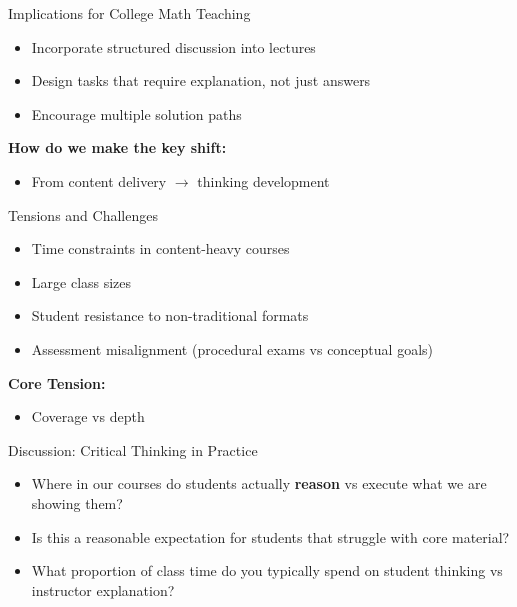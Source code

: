 \documentclass[dvipsnames]{beamer}
\begin{document}

\begin{frame}{Implications for College Math Teaching}
\begin{itemize}
    \item Incorporate structured discussion into lectures
    \item Design tasks that require explanation, not just answers
    \item Encourage multiple solution paths
\end{itemize}

\vspace{0.5cm}

\textbf{How do we make the key shift:}
\begin{itemize}
    \item From content delivery $\rightarrow$ thinking development
\end{itemize}
\end{frame}


\begin{frame}{Tensions and Challenges}
\begin{itemize}
    \item Time constraints in content-heavy courses
    \item Large class sizes
    \item Student resistance to non-traditional formats
    \item Assessment misalignment (procedural exams vs conceptual goals)
\end{itemize}

\vspace{0.5cm}

\textbf{Core Tension:}
\begin{itemize}
    \item Coverage vs depth
\end{itemize}
\end{frame}


\begin{frame}{Discussion: Critical Thinking in Practice}

\begin{itemize}
    \item Where in our courses do students actually \textbf{reason} vs execute what we are showing them?
    \item Is this a reasonable expectation for students that struggle with core material?
    \item What proportion of class time do you typically spend on student thinking vs instructor explanation?
\end{itemize}
\end{frame}
\end{document}
